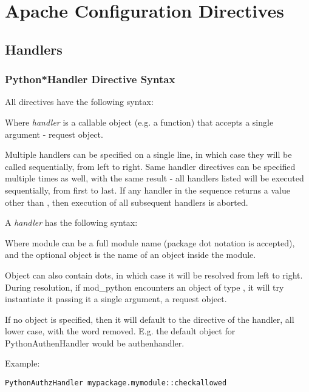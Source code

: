 \chapter{Apache Configuration Directives\label{directives}}

\section{Handlers\label{dir-handlers}}

\subsection{Python*Handler Directive Syntax\label{dir-handlers-syn}}

All  directives have the following syntax: 


Where \emph{handler} is a callable object (e.g. a function) that accepts a
single argument - request object.

Multiple handlers can be specified on a single line, in which case
they will be called sequentially, from left to right. Same handler
directives can be specified multiple times as well, with the same
result - all handlers listed will be executed sequentially, from first
to last. If any handler in the sequence returns a value other than
, then execution of all subsequent handlers is aborted.

A \emph{handler} has the following syntax: 


Where module can be a full module name (package dot notation is
accepted), and the optional object is the name of an object inside the
module.

Object can also contain dots, in which case it will be resolved from
left to right. During resolution, if mod_python encounters an object
of type , it will try instantiate it passing it a single
argument, a request object.

If no object is specified, then it will default to the directive of
the handler, all lower case, with the word 
removed. E.g. the default object for PythonAuthenHandler would be
authenhandler.

Example: 

\begin{verbatim}
PythonAuthzHandler mypackage.mymodule::checkallowed
\end{verbatim}

